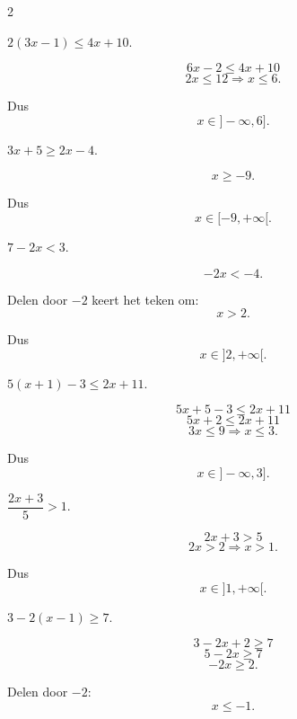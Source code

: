 \documentclass{ximera}
\begin{document}
\begin{oefening}[Eerstegraadsongelijkheden]{\oefB\ESS}
\begin{multicols}{2}
\begin{question}
$2(3x-1)\leq4x+10$.

\begin{oplossing}
\[
6x-2\leq4x+10
\]
\[
2x\leq12
\Rightarrow x\leq6.
\]

Dus
\[
x\in]-\infty,6].
\]
\end{oplossing}
\end{question}


\begin{question}
$3x+5\geq2x-4$.

\begin{oplossing}
\[
x\geq-9.
\]

Dus
\[
x\in[-9,+\infty[.
\]
\end{oplossing}
\end{question}


\begin{question}
$7-2x<3$.

\begin{oplossing}
\[
-2x<-4.
\]

Delen door $-2$ keert het teken om:
\[
x>2.
\]

Dus
\[
x\in]2,+\infty[.
\]
\end{oplossing}
\end{question}


\begin{question}
$5(x+1)-3\leq2x+11$.

\begin{oplossing}
\[
5x+5-3\leq2x+11
\]
\[
5x+2\leq2x+11
\]
\[
3x\leq9
\Rightarrow x\leq3.
\]

Dus
\[
x\in]-\infty,3].
\]
\end{oplossing}
\end{question}


\begin{question}
$\dfrac{2x+3}{5}>1$.

\begin{oplossing}
\[
2x+3>5
\]
\[
2x>2
\Rightarrow x>1.
\]

Dus
\[
x\in]1,+\infty[.
\]
\end{oplossing}
\end{question}


\begin{question}
$3-2(x-1)\geq7$.

\begin{oplossing}
\[
3-2x+2\geq7
\]
\[
5-2x\geq7
\]
\[
-2x\geq2.
\]

Delen door $-2$:
\[
x\leq-1.
\]


\end{oplossing}
\end{question}
\end{multicols}
\end{oefening}
\end{document}
